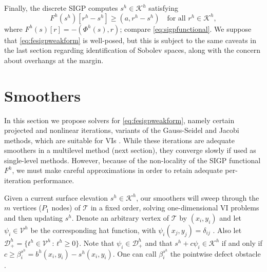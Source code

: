 \documentclass[letterpaper,final,12pt,reqno]{amsart}
\theoremstyle{claim}
\newcommand{\ip}[2]{\left(#1,#2\right)}
\numberwithin{equation}{section}
\numberwithin{figure}{section}
\numberwithin{table}{section}
\numberwithin{theorem}{section}
\begin{document}
Finally, the discrete SIGP computes $s^h \in \mathcal{K}^h$ satisfying
\begin{equation}
F^h(s^h)[r^h - s^h] \ge \ip{a}{r^h-s^h} \quad \text{for all } r^h \in \mathcal{K}^h , \label{eq:fesigpweakform}
\end{equation}
where $F^h(s)[r] = - \ip{\Phi^h(s)}{r}$; compare \eqref{eq:sigpfunctional}.  We suppose that \eqref{eq:fesigpweakform} is well-posed, but this is subject to the same caveats in the last section regarding identification of Sobolev spaces, along with the concern about overhangs at the margin.


\section{Smoothers} \label{sec:smoothers}

In this section we propose solvers for \eqref{eq:fesigpweakform}, namely certain projected and nonlinear iterations, variants of the Gauss-Seidel and Jacobi methods, which are suitable for VIs \cite{KinderlehrerStampacchia1980}.  While these iterations are adequate smoothers in a multilevel method (next section), they converge slowly if used as single-level methods.  However, because of the non-locality of the SIGP functional $F^h$, we must make careful approximations in order to retain adequate per-iteration performance.

Given a current surface elevation $s^h\in \mathcal{K}^h$, our smoothers will sweep through the $m$ vertices ($P_1$ nodes) of $\mathcal{T}$ in a fixed order, solving one-dimensional VI problems and then updating $s^h$.   Denote an arbitrary vertex of $\mathcal{T}$ by $(x_i,y_i)$ and let $\psi_i \in \mathcal{V}^h$ be the corresponding hat function, with $\psi_i(x_j,y_j)=\delta_{ij}$ \cite{Elmanetal2014}.  Also let $\mathcal{D}_+^h = \{t^h \in \mathcal{V}^h \,:\, t^h \ge 0\}$.  Note that $\psi_i \in \mathcal{D}_+^h$ and that $s^h + c \psi_i \in \mathcal{K}^h$ if and only if $c\ge \beta_i^{s^h} = b^h(x_i,y_i) - s^h(x_i,y_i)$.  One can call $\beta_i^{s^h}$ the pointwise defect obstacle \cite{GraeserKornhuber2009}.
\end{document}
